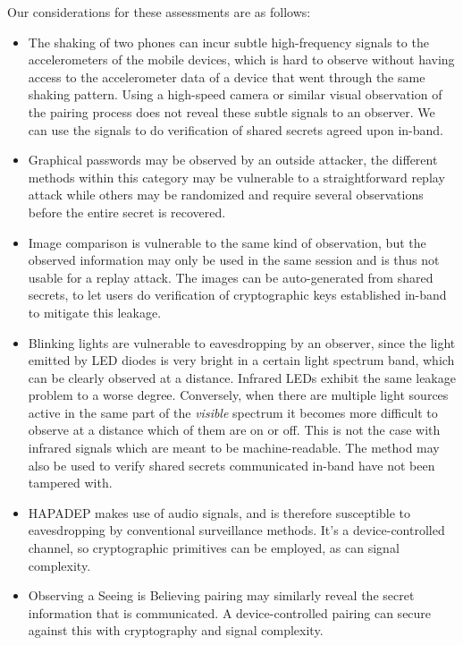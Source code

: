\documentclass[conference, 11pt]{sty/IEEEtran}
\begin{document}
Our considerations for these assessments are as follows:
\begin{itemize}
	\item The shaking of two phones can incur subtle high-frequency signals to the accelerometers of the mobile devices, which is hard to observe without having access to the accelerometer data of a device that went through the same shaking pattern.
	Using a high-speed camera or similar visual observation of the pairing process does not reveal these subtle signals to an observer.
	We can use the signals to do verification of shared secrets agreed upon in-band.
	\item Graphical passwords may be observed by an outside attacker, the different methods within this category may be vulnerable to a straightforward replay attack while others may be randomized and require several observations before the entire secret is recovered.
	\item Image comparison is vulnerable to the same kind of observation, but the observed information may only be used in the same session and is thus not usable for a replay attack.
	The images can be auto-generated from shared secrets, to let users do verification of cryptographic keys established in-band to mitigate this leakage.
	\item Blinking lights are vulnerable to eavesdropping by an observer, since the light emitted by LED diodes is very bright in a certain light spectrum band, which can be clearly observed at a distance.
	Infrared LEDs exhibit the same leakage problem to a worse degree.
	Conversely, when there are multiple light sources active in the same part of the \textit{visible} spectrum it becomes more difficult to observe at a distance which of them are on or off. This is not the case with infrared signals which are meant to be machine-readable.
	The method may also be used to verify shared secrets communicated in-band have not been tampered with.
	\item HAPADEP makes use of audio signals, and is therefore susceptible to eavesdropping by conventional surveillance methods. It's a device-controlled channel, so cryptographic primitives can be employed, as can signal complexity.
	\item Observing a Seeing is Believing pairing may similarly reveal the secret information that is communicated. A device-controlled pairing can secure against this with cryptography and signal complexity.
\end{itemize}
\end{document}
